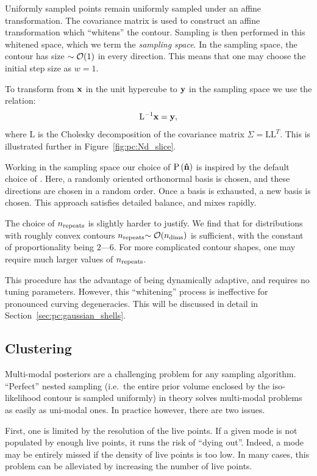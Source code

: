 Uniformly sampled points remain uniformly sampled under an affine transformation. The covariance matrix is used to construct an affine transformation which ``whitens'' the contour. Sampling is then performed in this whitened space, which we term the {\em sampling space}.
In the sampling space, the contour has size \({\sim\mathcal{O}{\left(1\right)}}\) in every direction. This means that one may choose the initial step size as \(w=1\).

To transform from \(\mathbf{x}\) in the unit hypercube to \(\mathbf{y}\) in the sampling space we use the relation:
\begin{equation}
  \mathrm{L}^{-1}\mathbf{x} =  \mathbf{y},
  \label{eqn:pc:cholesky}
\end{equation}
where \(\mathrm{L}\) is the Cholesky decomposition of the covariance matrix \(\Sigma = \mathrm{L} \mathrm{L}^{T}\).
This is illustrated further in Figure~\ref{fig:pc:Nd_slice}.

Working in the sampling space our choice of \(\mathrm{P}\left(\mathbf{\hat{n}}\right)\) is inspired by the default choice of \CosmoMC{} \citep{LewisFastSlow}. Here, a randomly oriented orthonormal basis is chosen, and these directions are chosen in a random order. Once a basis is exhausted, a new basis is chosen. This approach satisfies detailed balance, and mixes rapidly.

The choice of \(n_{\mathrm{repeats}}\) is slightly harder to justify. We find that for distributions with roughly convex contours \(n_{\mathrm{repeats}}{\sim\mathcal{O}{\left(n_{\mathrm{dims}}\right)}}\) is sufficient, with the constant of proportionality being \(2\)---\(6\). For more complicated contour shapes, one may require much larger values of \(n_{\mathrm{repeats}}\). 

This procedure has the advantage of being dynamically adaptive, and requires no tuning parameters. However, this ``whitening'' process is ineffective for pronounced curving degeneracies. This will be discussed in detail in Section~\ref{sec:pc:gaussian_shells}.


\subsection{Clustering}
\label{sec:pc:clustering}
Multi-modal posteriors are a challenging problem for any sampling algorithm. ``Perfect'' nested sampling (i.e.\ the entire prior volume enclosed by the iso-likelihood contour is sampled uniformly) in theory solves multi-modal problems as easily as uni-modal ones. In practice however, there are two issues.

First, one is limited by the resolution of the live points. If a given mode is not populated by enough live points, it runs the risk of ``dying out''. Indeed, a mode may be entirely missed if the density of live points is too low. In many cases, this problem can be alleviated by increasing the number of live points.

